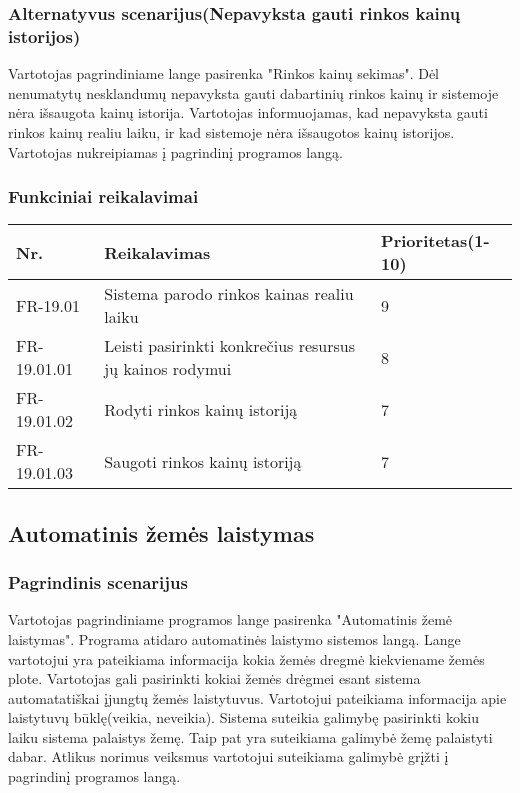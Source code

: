 \documentclass[oneside]{VUMIFPSkursinis}
\begin{document}
	\subsubsection{Alternatyvus scenarijus(Nepavyksta gauti rinkos kainų istorijos)}
	Vartotojas pagrindiniame lange pasirenka "Rinkos kainų sekimas". Dėl nenumatytų nesklandumų nepavyksta gauti dabartinių rinkos kainų ir sistemoje nėra išsaugota kainų istorija. Vartotojas informuojamas, kad nepavyksta gauti rinkos kainų realiu laiku, ir kad sistemoje nėra išsaugotos kainų istorijos. Vartotojas nukreipiamas į pagrindinį programos langą.
	\subsubsection{Funkciniai reikalavimai}
\begin{table}[htbp]
	\begin{tabularx}{1\textwidth}{ |P{2.5cm}|X|P{3cm }| } \hline
		Nr. & Reikalavimas & Prioritetas(1-10) \\ \hline
		FR-19.01 & Sistema parodo rinkos kainas realiu laiku &  9 \\ \hline
		FR-19.01.01 & Leisti pasirinkti konkrečius resursus jų kainos rodymui & 8 \\ \hline
		FR-19.01.02 & Rodyti rinkos kainų istoriją & 7 \\ \hline
		FR-19.01.03 & Saugoti rinkos kainų istoriją & 7 \\ \hline
	
	\end{tabularx}
\end{table}
	 
\subsection{Automatinis žemės laistymas}
	\subsubsection{Pagrindinis scenarijus}
	Vartotojas pagrindiniame programos lange pasirenka "Automatinis žemė laistymas". Programa atidaro automatinės laistymo sistemos langą. Lange vartotojui yra pateikiama informacija kokia žemės dregmė kiekviename žemės plote. Vartotojas gali pasirinkti kokiai žemės drėgmei esant sistema automatatiškai įjungtų žemės laistytuvus. Vartotojui pateikiama informacija apie laistytuvų būklę(veikia, neveikia). Sistema suteikia galimybę pasirinkti kokiu laiku sistema palaistys žemę. Taip pat yra suteikiama galimybė žemę palaistyti dabar. Atlikus norimus veiksmus vartotojui suteikiama galimybė grįžti į pagrindinį programos langą.
\end{document}
